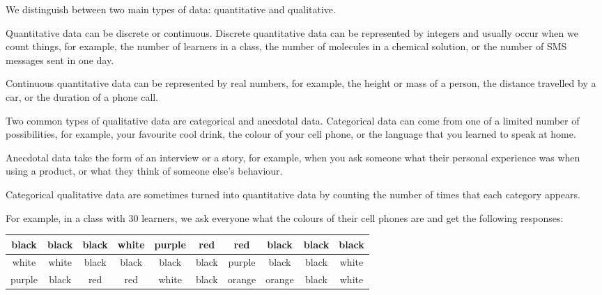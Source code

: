 We distinguish between two main types of data: quantitative and
qualitative.


Quantitative data can be discrete or continuous. Discrete quantitative
data can be represented by integers and usually occur when we count
things, for example, the number of learners in a class, the number of
molecules in a chemical solution, or the number of SMS messages sent
in one day.\par

Continuous quantitative data can be represented by real numbers, for
example, the height or mass of a person, the distance travelled by a
car, or the duration of a phone call.


Two common types of qualitative data are categorical and anecdotal
data. Categorical data can come from one of a limited number of
possibilities, for example, your favourite cool drink, the colour of
your cell phone, or the language that you learned to speak at home.\par

Anecdotal data take the form of an interview or a story, for example,
when you ask someone what their personal experience was when using a
product, or what they think of someone else's behaviour.\par

Categorical qualitative data are sometimes turned into quantitative
data by counting the number of times that each category appears.\par

For example, in a class with $30$ learners, we ask everyone what the colours of
  their cell phones are and get the following responses:

  \begin{center}
    \begin{tabular}{|c|c|c|c|c|c|c|c|c|c|}\hline
     
      black & black & black & white & purple & red & red & black & black & black \\ \hline
      white & white & black & black & black & black & purple & black & black & white \\ \hline
      purple & black & red & red & white & black & orange & orange & black & white \\ \hline
     
    \end{tabular}
  \end{center}


